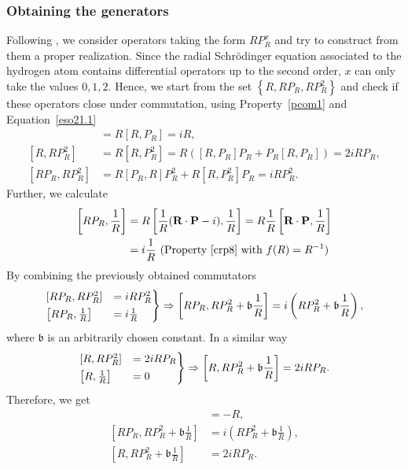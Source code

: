 \documentclass[12pt,a4paper]{report}
\theoremstyle{definition}
\theoremstyle{remark}
\theoremstyle{remark}
\begin{document}
\subsubsection{Obtaining the generators}
Following \cite{cizekpaldus}, we consider operators taking the form $RP_R^x$ and try to construct from them a proper realization. Since the radial Schrödinger equation associated to the hydrogen atom contains differential operators up to the second order, $x$ can only take the values $0,1,2$. Hence, we start from the set $\left\lbrace R,RP_R,RP_R^2 \right\rbrace$ and check if these operators close under commutation, using Property~\ref{pcom1} and Equation~\ref{eso21.1}
\begin{align*}
[R,RP_R]&=R[R,P_R]=iR, \\
[R,RP_R^2]&=R[R,P_R^2]=R([R,P_R]P_R+P_R[R,P_R])= 2iRP_R, \\
[RP_R,RP_R^2]&= R[P_R,R]P_R^2+R[R,P_R^2]P_R= iRP_R^2.
\end{align*}
Further, we calculate
\begin{align*}
\left[RP_R,\frac{1}{R}\right]&=R\left[\frac{1}{R}(\textbf{R}\cdot\textbf{P}-i),\frac{1}{R}\right]= R\frac{1}{R}\left[\textbf{R}\cdot\textbf{P},\frac{1}{R}\right] \\
&= i\frac{1}{R} \text{ (Property~\ref{crp8} with }f(R)=R^{-1})
\end{align*}
By combining the previously obtained commutators
\begin{align*}
\begin{rcases} \relax
[RP_R,RP_R^2]&=iRP_R^2\\
\left[RP_R,\frac{1}{R}\right]&=i\frac{1}{R}
\end{rcases}
\Rightarrow \left[RP_R,RP_R^2+\mathfrak{b}\frac{1}{R}\right]=i\left(RP_R^2+\mathfrak{b}\frac{1}{R}\right),
\end{align*}
where $\mathfrak{b}$ is an arbitrarily chosen constant. In a similar way
\begin{align*}
\begin{rcases} \relax
[R,RP_R^2]&=2iRP_R\\
\left[R,\frac{1}{R}\right]&=0
\end{rcases}
\Rightarrow \left[R,RP_R^2+\mathfrak{b}\frac{1}{R}\right]=2iRP_R.
\end{align*}
Therefore, we get
\begin{align*}
[RP_R,R]&=-R,\\
\left[RP_R,RP_R^2+\mathfrak{b}\frac{1}{R}\right]&=i\left(RP_R^2+\mathfrak{b}\frac{1}{R}\right),\\
\left[R,RP_R^2+\mathfrak{b}\frac{1}{R}\right]&=2iRP_R.
\end{align*}
\end{document}
